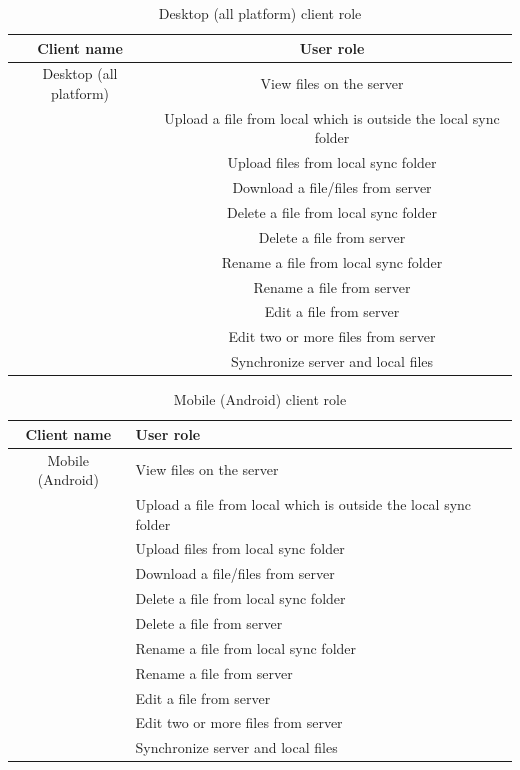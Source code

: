 \begin{table}[H]
\centering
\caption{Desktop (all platform) client role}
\begin{tabular}{|c|c|}
\hline
Client name & User role\\
\hline
{Desktop (all platform)} & View files on the server \\ \cline{2-2}
& Upload a file from local which is outside the local sync folder \\
\cline{2-2}
& Upload files from local sync folder\\
\cline{2-2}
&Download a file/files from server\\
\cline{2-2}
&Delete a file from local sync folder\\
\cline{2-2}
&Delete a file from server\\
\cline{2-2}
&Rename a file from local sync folder\\
\cline{2-2}
&Rename a file from server\\
\cline{2-2}
&Edit a file from server\\
\cline{2-2}
&Edit two or more files from server\\
\cline{2-2}
&Synchronize server and local files\\
\hline
\bottomrule
\end{tabular}
\end{table}


\begin{table}[H]
\centering
\caption{Mobile (Android) client role}
\begin{tabular}{|c|l|}
\hline
Client name & User role\\
\hline
{Mobile (Android)} & View files on the server \\ \cline{2-2}
& Upload a file from local which is outside the local sync folder \\
\cline{2-2}
& Upload files from local sync folder\\
\cline{2-2}
&Download a file/files from server\\
\cline{2-2}
&Delete a file from local sync folder\\
\cline{2-2}
&Delete a file from server\\
\cline{2-2}
&Rename a file from local sync folder\\
\cline{2-2}
&Rename a file from server\\
\cline{2-2}
&Edit a file from server\\
\cline{2-2}
&Edit two or more files from server\\
\cline{2-2}
&Synchronize server and local files\\
\hline
\bottomrule
\end{tabular}
\end{table}

